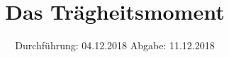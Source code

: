 

\subject{Nr. 101}
\title{Das Trägheitsmoment}
\date{%
  Durchführung: 04.12.2018
  \hspace{3em}
  Abgabe: 11.12.2018
}



\maketitle
\thispagestyle{empty}
\tableofcontents
\newpage






\printbibliography{}


